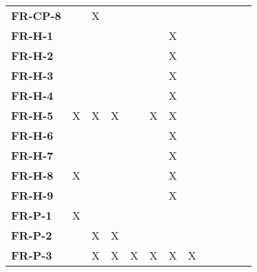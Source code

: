\documentclass[12pt, titlepage]{article}
\begin{document}
\begin{table}[H]
\begin{adjustbox}{max width=0.7\paperwidth}
\begin{tabular}{l|ccccccccccc}
        \textbf{FR-CP-8}   & ~ & X & ~ & ~ & ~ & ~ & ~ & ~\\
        \textbf{FR-H-1}    & ~ & ~ & ~ & ~ & ~ & X & ~ & ~\\
        \textbf{FR-H-2}    & ~ & ~ & ~ & ~ & ~ & X & ~ & ~\\
        \textbf{FR-H-3}    & ~ & ~ & ~ & ~ & ~ & X & ~ & ~\\
        \textbf{FR-H-4}    & ~ & ~ & ~ & ~ & ~ & X & ~ & ~\\
        \textbf{FR-H-5}    & X & X & X & ~ & X & X & ~ & ~\\
        \textbf{FR-H-6}    & ~ & ~ & ~ & ~ & ~ & X & ~ & ~\\
        \textbf{FR-H-7}    & ~ & ~ & ~ & ~ & ~ & X & ~ & ~\\
        \textbf{FR-H-8}    & X & ~ & ~ & ~ & ~ & X & ~ & ~\\
        \textbf{FR-H-9}    & ~ & ~ & ~ & ~ & ~ & X & ~ & ~\\
        \textbf{FR-P-1}    & X & ~ & ~ & ~ & ~ & ~ & ~ & ~\\
        \textbf{FR-P-2}    & ~ & X & X & ~ & ~ & ~ & ~ & ~\\
        \textbf{FR-P-3}    & ~ & X & X & X & X & X & X & ~\\
    \end{tabular}
    \end{adjustbox}
    \label{Traceability Matrix: Functional Requirement}
\end{table}
\end{document}
